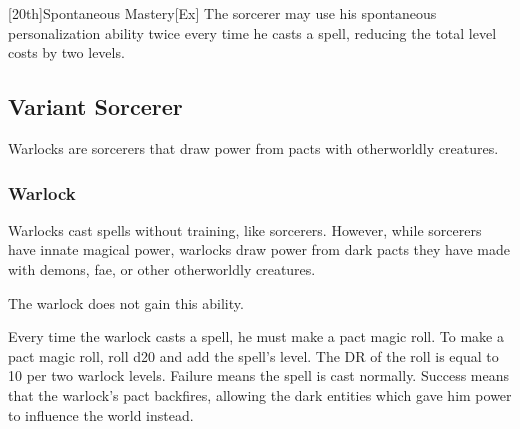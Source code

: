         [20th]{Spontaneous Mastery}[Ex]
        The sorcerer may use his spontaneous personalization ability twice every time he casts a spell, reducing the total level costs by two levels.

    \subsection{Variant Sorcerer}

        Warlocks are sorcerers that draw power from pacts with otherworldly creatures.

        \subsubsection{Warlock}

            Warlocks cast spells without training, like sorcerers.
            However, while sorcerers have innate magical power, warlocks draw power from dark pacts they have made with demons, fae, or other otherworldly creatures.

             The warlock does not gain this ability.

             Every time the warlock casts a spell, he must make a pact magic roll.
            To make a pact magic roll, roll d20 and add the spell's level.
            The DR of the roll is equal to 10  per two warlock levels.
            Failure means the spell is cast normally.
            Success means that the warlock's pact backfires, allowing the dark entities which gave him power to influence the world instead.

